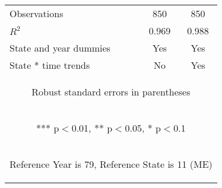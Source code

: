 \begin{center}
\begin{tabular}{lcc}
Observations & 850 & 850 \\
$R^2$ & 0.969 & 0.988 \\
State and year dummies & Yes & Yes \\
 State * time trends & No & Yes \\ \hline
\multicolumn{3}{c}{\begin{footnotesize} Robust standard errors in parentheses\end{footnotesize}} \\
\multicolumn{3}{c}{\begin{footnotesize} *** p$<$0.01, ** p$<$0.05, * p$<$0.1\end{footnotesize}} \\
\multicolumn{3}{c}{\begin{footnotesize} Reference Year is 79, Reference State is 11 (ME)\end{footnotesize}} \\
\end{tabular}
\end{center}
